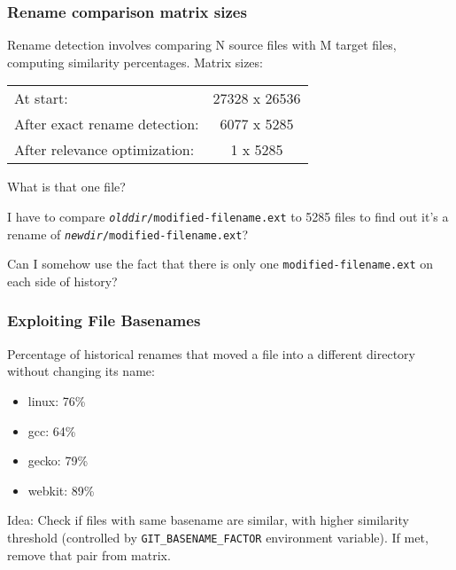 \documentclass[compress,t]{beamer}
\begin{document}
\begin{frame}
  \frametitle{Rename comparison matrix sizes}

  Rename detection involves comparing N source files with M target files,
  computing similarity percentages.  Matrix sizes:\\[1em]
  \pause
  \qquad
  \begin{tabular}{lc}
    At start:                     & 27328 x 26536 \\
    After exact rename detection: &  6077 x  5285 \\
    After relevance optimization: &   \hspace*{1.75em}1 x  5285
  \end{tabular}

  \pause
  \vspace*{\baselineskip}
  What is that one file?

  \pause
  \vspace*{\baselineskip}
  I have to compare \texttt{\textit{olddir}/modified-filename.ext} to
  5285 files to find out it's a rename
  of \texttt{\textit{newdir}/modified-filename.ext}?

  \pause
  \vspace*{\baselineskip}
  Can I somehow use the fact that there is only
  one \texttt{modified-filename.ext} on each side of history?
  
\end{frame}


\begin{frame}
  \frametitle{Exploiting File Basenames}

  Percentage of historical renames that moved a file into a different
  directory without changing its name:
  \pause
  \begin{itemize}
    \item linux: 76\%
    \item gcc: 64\%
    \item gecko: 79\%
    \item webkit: 89\%
  \end{itemize}

  \pause
  \vspace*{\baselineskip}
  Idea: Check if files with same basename are similar, with higher
  similarity threshold (controlled by \texttt{GIT\_BASENAME\_FACTOR}
  environment variable).  If met, remove that pair from matrix.

\end{frame}
\end{document}

